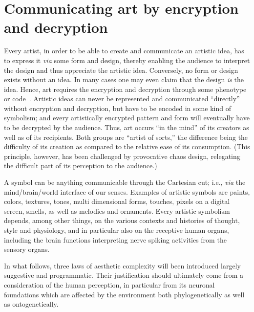 \documentclass[%
 reprint,
 showpacs,
 showkeys,
 amsmath,
 amssymb,
 aps,
 pra,
 longbibliography,
 floatfix,
 ]{revtex4-1}
\begin{document}
\section{Communicating art by encryption and decryption}

Every artist, in order to be able to create and communicate an artistic idea, has to express it {\em via} some form and design,
thereby enabling the audience to interpret the design and thus appreciate the artistic idea.
Conversely, no form or design exists without an idea.
In many cases one may even claim that the design {\em is} the idea.
Hence, art requires the encryption and decryption through some  phenotype or code~\cite{moles-65}.
Artistic ideas can never be  represented and communicated ``directly'' without encryption and decryption,
but have to be encoded in some kind of symbolism;
and every artistically encrypted pattern and form will eventually have to be decrypted by the audience.
Thus, art occurs ``in the mind'' of its creators as well as of its recipients.
Both groups are ``artist of sorts,''
the difference being the difficulty of its creation as compared to the relative ease of its consumption.
(This principle, however, has been challenged by provocative chaos design,
relegating the difficult part of its perception to the audience.)

A symbol can be anything communicable through the Cartesian cut; i.e., {\it via} the mind/brain/world interface of our senses.
Examples of artistic symbols are paints, colors, textures, tones, multi dimensional forms,
touches, pixels on a digital screen, smells, as well as melodies and ornaments.
Every artistic symbolism depends, among other things,
on the various contexts and histories of thought, style and physiology,
and in particular also on the receptive human organs,
including the brain functions interpreting nerve spiking activities from the sensory organs.

In what follows, three laws  of aesthetic complexity will been introduced largely suggestive and programmatic.
Their justification should ultimately come from a consideration of the human perception,
in particular from its neuronal foundations which are affected by the environment both phylogenetically as well as ontogenetically.
\end{document}

